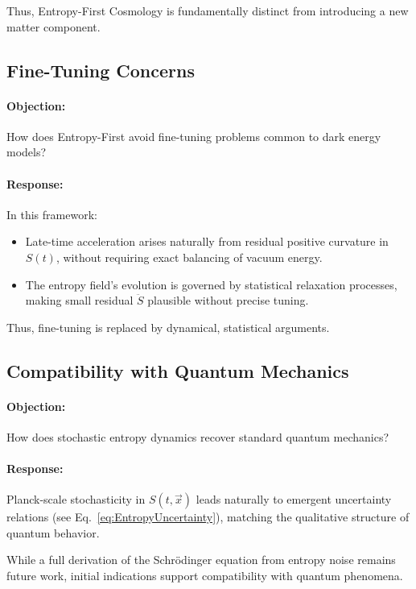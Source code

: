 \documentclass{article}
\begin{document}
Thus, Entropy-First Cosmology is fundamentally distinct from introducing a new matter component.



\subsection{Fine-Tuning Concerns}

\paragraph{Objection:}  
How does Entropy-First avoid fine-tuning problems common to dark energy models?

\paragraph{Response:}
In this framework:
\begin{itemize}
    \item Late-time acceleration arises naturally from residual positive curvature in $S(t)$, without requiring exact balancing of vacuum energy.
    \item The entropy field’s evolution is governed by statistical relaxation processes, making small residual $\ddot{S}$ plausible without precise tuning.
\end{itemize}

Thus, fine-tuning is replaced by dynamical, statistical arguments.



\subsection{Compatibility with Quantum Mechanics}

\paragraph{Objection:}  
How does stochastic entropy dynamics recover standard quantum mechanics?

\paragraph{Response:}
Planck-scale stochasticity in $S(t, \vec{x})$ leads naturally to emergent uncertainty relations (see Eq.~\eqref{eq:EntropyUncertainty}), matching the qualitative structure of quantum behavior.

While a full derivation of the Schr\"odinger equation from entropy noise remains future work, initial indications support compatibility with quantum phenomena.
\end{document}
